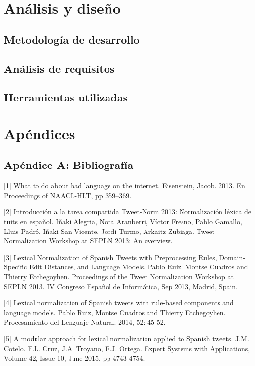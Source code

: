 \documentclass[14pt]{extarticle}
\theoremstyle{definition}
\theoremstyle{remark}
\begin{document}
\section{Análisis y diseño}\label{sec:analisisydiseno}
\subsection{Metodología de desarrollo}\label{sec:metodologiadedesarrollo}
\subsection{Análisis de requisitos}\label{sec:analisisderequisitos}
\subsection{Herramientas utilizadas}
\section{Apéndices}\label{sec:apendices}
\subsection{Apéndice A: Bibliografía}\label{sec:bibliografia}


[1] What to do about bad language on the internet. Eisenstein, Jacob. 2013. En Proceedings of NAACL-HLT, pp 359–369.

[2] Introducción a la tarea compartida Tweet-Norm 2013: Normalización léxica de tuits en español. Iñaki Alegria, Nora Aranberri, Víctor Fresno, Pablo Gamallo, Lluis Padró, Iñaki San Vicente, Jordi Turmo, Arkaitz Zubiaga. Tweet Normalization Workshop at SEPLN 2013: An overview.

[3] Lexical Normalization of Spanish Tweets with Preprocessing Rules, Domain-Specific Edit Distances, and Language Models. Pablo Ruiz, Montse Cuadros and Thierry Etchegoyhen. Proceedings of the Tweet Normalization Workshop at SEPLN 2013. IV Congreso Español de Informática, Sep 2013, Madrid, Spain.

[4] Lexical normalization of Spanish tweets with rule-based components and language models. Pablo Ruiz, Montse Cuadros and Thierry Etchegoyhen. Procesamiento del Lenguaje Natural. 2014, 52: 45-52.

[5] A modular approach for lexical normalization applied to Spanish tweets. J.M. Cotelo. F.L. Cruz, J.A. Troyano, F.J. Ortega. Expert Systems with Applications, Volume 42, Issue 10, June 2015, pp 4743-4754.
\end{document}
